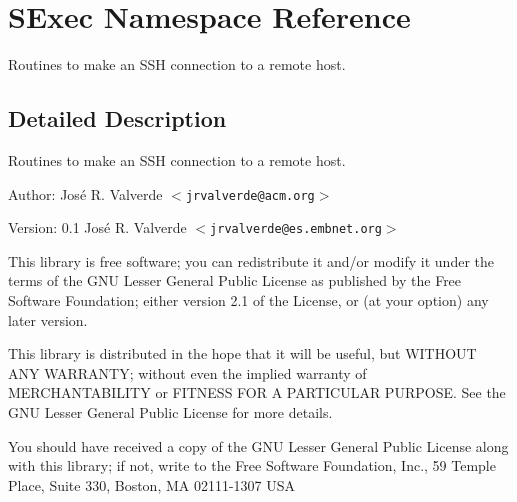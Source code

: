 \section{SExec Namespace Reference}
\label{namespaceSExec}
Routines to make an SSH connection to a remote host.  




\subsection{Detailed Description}
Routines to make an SSH connection to a remote host. 

\begin{Desc}
\item[Author:]Jos\'{e} R. Valverde $<${\tt jrvalverde@acm.org}$>$ \end{Desc}
\begin{Desc}
\item[Version:]0.1  Jos\'{e} R. Valverde $<${\tt jrvalverde@es.embnet.org}$>$\end{Desc}
This library is free software; you can redistribute it and/or modify it under the terms of the GNU Lesser General Public License as published by the Free Software Foundation; either version 2.1 of the License, or (at your option) any later version.

This library is distributed in the hope that it will be useful, but WITHOUT ANY WARRANTY; without even the implied warranty of MERCHANTABILITY or FITNESS FOR A PARTICULAR PURPOSE. See the GNU Lesser General Public License for more details.

You should have received a copy of the GNU Lesser General Public License along with this library; if not, write to the Free Software Foundation, Inc., 59 Temple Place, Suite 330, Boston, MA 02111-1307 USA 

